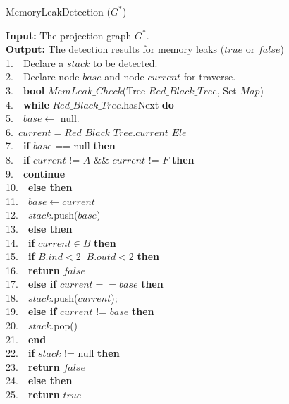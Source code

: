 \begin{algorithm}
\caption{MemoryLeakDetection ($G^*$)}\label{alg:mld}
\textbf{Input:} The projection graph $G^*$.\\
\textbf{Output:} The detection results for memory leaks ($\mathit{true}$ or $\mathit{false}$)\\
1.\ \	Declare a $\mathit{stack}$ to be detected.\\
2.\ \ 	Declare node $\mathit{base}$ and node $\mathit{current}$ for traverse.\\
3.\ \       \textbf{bool} $\mathit{MemLeak\_Check}$(Tree $\mathit{Red\_Black\_Tree}$, Set $\mathit{Map}$)\\
4.\ \ 	\textbf{while} $\mathit{Red\_Black\_Tree}$.hasNext \textbf{do} \\
5.\ \ \quad	    $\mathit{base} \leftarrow$ null.\\
6.\ \quad	    $\mathit{current} = \mathit{Red\_Black\_Tree}$.$\mathit{current\_Ele}$\\
7.\ \ \quad	    \textbf{if} $\mathit{base}$ == null \textbf{then}\\
8.\ \ \quad\quad	        \textbf{if} $\mathit{current}$ != $A$ \&\& $\mathit{current}$ != $F$ \textbf{then}\\
9.\ \ \quad\quad\quad	            \textbf{continue}\\
10.\ \ \quad\quad	        \textbf{else then}\\
11.\ \ \quad\quad\quad	            $\mathit{base} \leftarrow \mathit{current}$\\
12.\ \ \quad\quad\quad	            $\mathit{stack}$.push($\mathit{base}$)\\
13.\ \ \quad	    \textbf{else then}\\
14.\ \ \quad\quad       \textbf{if} $\mathit{current}\in B$ \textbf{then}\\
15.\ \ \quad\quad\quad            \textbf{if} $B.ind<2 || B.outd<2$ \textbf{then}\\
16.\ \ \quad\quad\quad\quad	                \textbf{return} $\mathit{false}$\\
17.\ \ \quad\quad\quad        \textbf{else if} $\mathit{current} == \mathit{base}$ \textbf{then}\\
18.\ \ \quad\quad\quad\quad	            $\mathit{stack}$.push($\mathit{current}$);\\
19.\ \ \quad\quad\quad	        \textbf{else if} $\mathit{current}$ != $\mathit{base}$ \textbf{then}\\
20.\ \ \quad\quad\quad\quad	            $\mathit{stack}$.pop()\\
21.\ \ 	\textbf{end}\\
22.\ \ 	\textbf{if} $\mathit{stack}$ != null \textbf{then}\\
23.\ \ \quad    \textbf{return} $\mathit{false}$\\
24.\ \ 	\textbf{else then}\\
25.\ \ \quad	    \textbf{return} $\mathit{true}$\\
\end{algorithm}

